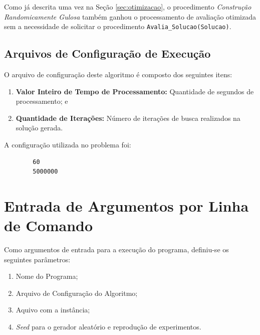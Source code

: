 \documentclass[portugues, brazil, a4paper,12pt]{article}
\begin{document}
		Como já descrita uma vez na Seção \ref{sec:otimizacao}, o procedimento \textit{Construção Randomicamente Gulosa} também ganhou o processamento de avaliação otimizada sem a necessidade de solicitar o procedimento \verb|Avalia_Solucao(Solucao)|.
	
	
	\subsection{Arquivos de Configuração de Execução}
		O arquivo de configuração deste algoritmo é composto dos seguintes itens:
		
		\begin{enumerate}
			\item \textbf{Valor Inteiro de Tempo de Processamento:} Quantidade de segundos de processamento; e
			
			\item \textbf{Quantidade de Iterações:} Número de iterações de busca realizados na solução gerada.
		\end{enumerate}
		
		A configuração utilizada no problema foi:
		
		\begin{verbatim}
		60
		5000000
		\end{verbatim}




\section{Entrada de Argumentos por Linha de Comando}

	Como argumentos de entrada para a execução do programa, definiu-se os seguintes parâmetros:
	
	\begin{enumerate}
		\item Nome do Programa;
		\item Arquivo de Configuração do Algoritmo;
		\item Aquivo com a instância;
		\item \textit{Seed} para o gerador aleatório e reprodução de experimentos.
	\end{enumerate}
\end{document}
